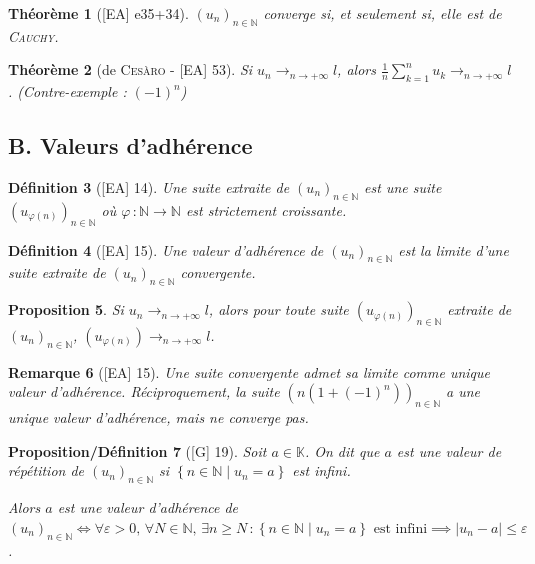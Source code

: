\documentclass[10pt, a4paper, parskip=full, twoside, twocolumn]{report}
\newtheorem{definition}{Définition}
\newtheorem{theorem}[definition]{Théorème}
\newtheorem{proposition}[definition]{Proposition}
\newtheorem{proposition_def}[definition]{Proposition/Définition}
\newtheorem{remark}[definition]{Remarque}
\newcommand{\IN}{\mathbb{N}}
\newcommand{\IK}{\mathbb{K}}
\begin{document}
\begin{theorem}[\textnormal{[EA] e35+34}]
	$\left(u_n\right)_{n\in\IN}$ converge si, et seulement si, elle est de \textsc{Cauchy}.
\end{theorem}

\begin{theorem}[de \textsc{Cesàro} - \textnormal{[EA] 53}]
	Si $u_n\longrightarrow_{n\to +\infty} l$, alors $\frac{1}{n}\sum_{k=1}^{n} u_k \longrightarrow_{n\to +\infty} l$. (Contre-exemple :  $(-1)^n$)
\end{theorem}

\subsection*{B. Valeurs d'adhérence}
\begin{definition}[\textnormal{[EA] 14}]
	Une \emph{suite extraite de $\left(u_n\right)_{n\in\IN}$} est une suite $\left(u_{\varphi(n)}\right)_{n\in\IN}$ où $\varphi\,\colon\IN\to\IN$ est strictement croissante.
\end{definition}

\begin{definition}[\textnormal{[EA] 15}]
	Une \emph{valeur d'adhérence} de $\left(u_n\right)_{n\in\IN}$ est la limite d'une suite extraite de $\left(u_n\right)_{n\in\IN}$ convergente.
\end{definition}

\begin{proposition}
	Si $u_n\longrightarrow_{n\to +\infty} l$, alors pour toute suite $\left(u_{\varphi(n)}\right)_{n\in\IN}$ extraite de $\left(u_n\right)_{n\in\IN}$, $\left(u_{\varphi(n)}\right)\longrightarrow_{n\to +\infty} l$.
\end{proposition}

\begin{remark}[\textnormal{[EA] 15}]
	Une suite convergente admet sa limite comme unique valeur d'adhérence. Réciproquement,
	la suite $\left(n(1+(-1)^n)\right)_{n\in\IN}$ a une unique valeur d'adhérence, mais ne converge pas.
\end{remark}

\begin{proposition_def}[\textnormal{[G] 19}]
	Soit $a\in\IK$. On dit que $a$ est \emph{une valeur de répétition de $\left(u_n\right)_{n\in \IN}$} si $\left\{n\in \IN \mid u_n = a\right\}$ est infini.
	
	Alors $a$ est une valeur d'adhérence de $\left(u_n\right)_{n\in\IN}\iff \forall \varepsilon > 0,\,\forall N\in\IN,\, \exists n\geq N\,\colon \left\{n\in\IN\mid u_n=a\right\}\text{ est infini}\implies\vert u_n - a\vert \leq \varepsilon$.
\end{proposition_def}
\end{document}
